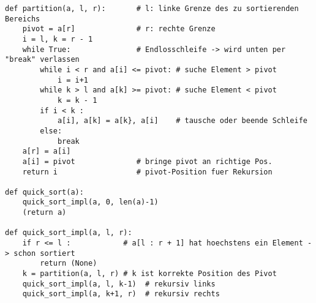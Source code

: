     \begin{verbatim}
def partition(a, l, r):       # l: linke Grenze des zu sortierenden Bereichs
    pivot = a[r]              # r: rechte Grenze
    i = l, k = r - 1
    while True:               # Endlosschleife -> wird unten per "break" verlassen
        while i < r and a[i] <= pivot: # suche Element > pivot
            i = i+1
        while k > l and a[k] >= pivot: # suche Element < pivot
            k = k - 1
        if i < k :
            a[i], a[k] = a[k}, a[i]    # tausche oder beende Schleife
        else:
            break
    a[r] = a[i]
    a[i] = pivot              # bringe pivot an richtige Pos.
    return i                  # pivot-Position fuer Rekursion

def quick_sort(a):
    quick_sort_impl(a, 0, len(a)-1)
    (return a)

def quick_sort_impl(a, l, r):
    if r <= l :            # a[l : r + 1] hat hoechstens ein Element -> schon sortiert
        return (None)
    k = partition(a, l, r) # k ist korrekte Position des Pivot
    quick_sort_impl(a, l, k-1)  # rekursiv links
    quick_sort_impl(a, k+1, r)  # rekursiv rechts
    \end{verbatim}

